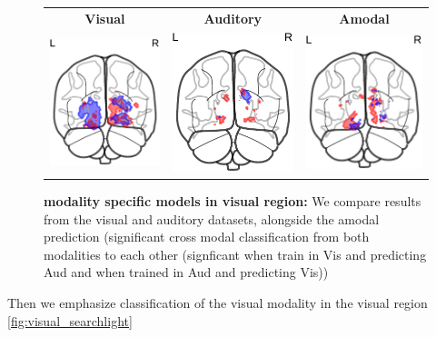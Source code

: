 \begin{figure}[ht]
\scriptsize
\vspace{5ex}
\hspace{-4ex}
\begin{tabular}{ccc}
\textbf{\Large Visual} & \textbf{\Large Auditory} & \textbf{\Large Amodal}\\
{\includegraphics[width=.18\linewidth]{figures/part_II/searchlight/amodal/visual_Vis-Vis_segmentation.pdf}}
\hspace{1ex}
&{\includegraphics[width=.18\linewidth]{figures/part_II/searchlight/amodal/visual_Aud-Aud_segmentation.pdf}}
\hspace{1ex}
&{\includegraphics[width=.18\linewidth]{figures/part_II/searchlight/amodal/visual_amodal_segmentation.pdf}}
\hspace{1ex}\\
\end{tabular}
\vspace{3ex}
\caption{\textbf{modality specific models in visual region:} We compare results from the visual and auditory datasets, alongside the amodal prediction (significant cross modal classification from both modalities to each other (signficant when train in Vis and predicting Aud and when trained in Aud and predicting Vis))}
\label{fig:visual_amodal}
\end{figure}


Then we emphasize classification of the visual modality in the visual region \ref{fig:visual_searchlight}


